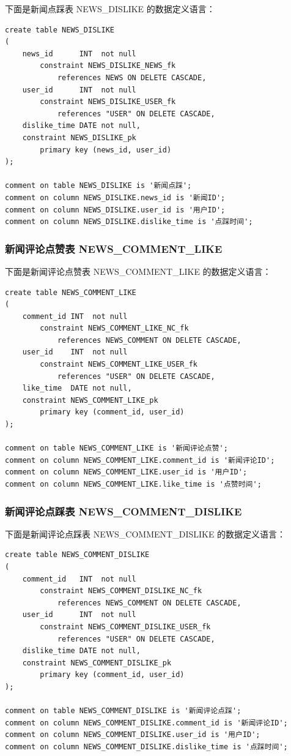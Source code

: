 下面是新闻点踩表 NEWS\_DISLIKE 的数据定义语言：

\begin{verbatim}
create table NEWS_DISLIKE
(
    news_id      INT  not null
        constraint NEWS_DISLIKE_NEWS_fk
            references NEWS ON DELETE CASCADE,
    user_id      INT  not null
        constraint NEWS_DISLIKE_USER_fk
            references "USER" ON DELETE CASCADE,
    dislike_time DATE not null,
    constraint NEWS_DISLIKE_pk
        primary key (news_id, user_id)
);

comment on table NEWS_DISLIKE is '新闻点踩';
comment on column NEWS_DISLIKE.news_id is '新闻ID';
comment on column NEWS_DISLIKE.user_id is '用户ID';
comment on column NEWS_DISLIKE.dislike_time is '点踩时间';
\end{verbatim}

\subsubsection{新闻评论点赞表 NEWS\_COMMENT\_LIKE}

下面是新闻评论点赞表 NEWS\_COMMENT\_LIKE 的数据定义语言：

\begin{verbatim}
create table NEWS_COMMENT_LIKE
(
    comment_id INT  not null
        constraint NEWS_COMMENT_LIKE_NC_fk
            references NEWS_COMMENT ON DELETE CASCADE,
    user_id    INT  not null
        constraint NEWS_COMMENT_LIKE_USER_fk
            references "USER" ON DELETE CASCADE,
    like_time  DATE not null,
    constraint NEWS_COMMENT_LIKE_pk
        primary key (comment_id, user_id)
);

comment on table NEWS_COMMENT_LIKE is '新闻评论点赞';
comment on column NEWS_COMMENT_LIKE.comment_id is '新闻评论ID';
comment on column NEWS_COMMENT_LIKE.user_id is '用户ID';
comment on column NEWS_COMMENT_LIKE.like_time is '点赞时间';
\end{verbatim}

\subsubsection{新闻评论点踩表 NEWS\_COMMENT\_DISLIKE}

下面是新闻评论点踩表 NEWS\_COMMENT\_DISLIKE 的数据定义语言：

\begin{verbatim}
create table NEWS_COMMENT_DISLIKE
(
    comment_id   INT  not null
        constraint NEWS_COMMENT_DISLIKE_NC_fk
            references NEWS_COMMENT ON DELETE CASCADE,
    user_id      INT  not null
        constraint NEWS_COMMENT_DISLIKE_USER_fk
            references "USER" ON DELETE CASCADE,
    dislike_time DATE not null,
    constraint NEWS_COMMENT_DISLIKE_pk
        primary key (comment_id, user_id)
);

comment on table NEWS_COMMENT_DISLIKE is '新闻评论点踩';
comment on column NEWS_COMMENT_DISLIKE.comment_id is '新闻评论ID';
comment on column NEWS_COMMENT_DISLIKE.user_id is '用户ID';
comment on column NEWS_COMMENT_DISLIKE.dislike_time is '点踩时间';
\end{verbatim}


